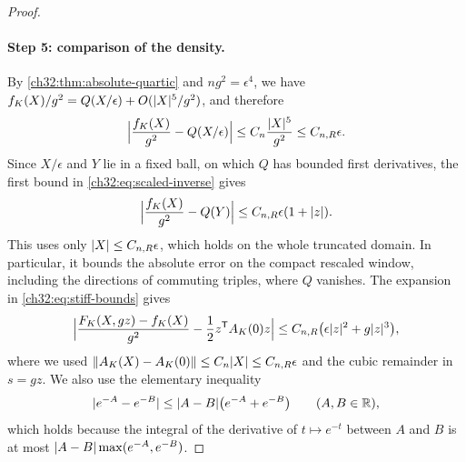 \begin{proof}
\paragraph{Step 5: comparison of the density.}
By \cref{ch32:thm:absolute-quartic} and $ng^2=\epsilon^4$, we have $f_K(X)/g^2=Q(X/\epsilon)+O(\lvert X\rvert^5/g^2)$, and therefore
\[
 \Bigl\lvert\frac{f_K(X)}{g^2}-Q(X/\epsilon)\Bigr\rvert\le C_n\frac{\lvert X\rvert^5}{g^2}\le C_{n,R}\epsilon.
\]
Since $X/\epsilon$ and $Y$ lie in a fixed ball, on which $Q$ has bounded first derivatives, the first bound in \eqref{ch32:eq:scaled-inverse} gives
\begin{equation}\label{ch32:eq:constant-phase-error}
 \Bigl\lvert\frac{f_K(X)}{g^2}-Q(Y)\Bigr\rvert\le C_{n,R}\epsilon(1+\lvert z\rvert).
\end{equation}
This uses only $\lvert X\rvert\le C_{n,R}\epsilon$, which holds on the whole truncated domain. In particular, it bounds the absolute error on the compact rescaled window, including the directions of commuting triples, where $Q$ vanishes. The expansion in \eqref{ch32:eq:stiff-bounds} gives
\begin{equation}\label{ch32:eq:stiff-phase-error}
 \Bigl\lvert\frac{F_K(X,gz)-f_K(X)}{g^2}-\frac12z^{\mathsf T}A_K(0)z\Bigr\rvert\le C_{n,R}\bigl(\epsilon\lvert z\rvert^2+g\lvert z\rvert^3\bigr),
\end{equation}
where we used $\lVert A_K(X)-A_K(0)\rVert\le C_n\lvert X\rvert\le C_{n,R}\epsilon$ and the cubic remainder in $s=gz$. We also use the elementary inequality
\begin{equation}\label{ch32:eq:exponential-difference}
 \lvert e^{-A}-e^{-B}\rvert\le\lvert A-B\rvert\bigl(e^{-A}+e^{-B}\bigr)\qquad(A,B\in\mathbb R),
\end{equation}
which holds because the integral of the derivative of $t\mapsto e^{-t}$ between $A$ and $B$ is at most $\lvert A-B\rvert\max(e^{-A},e^{-B})$.


\end{proof}
